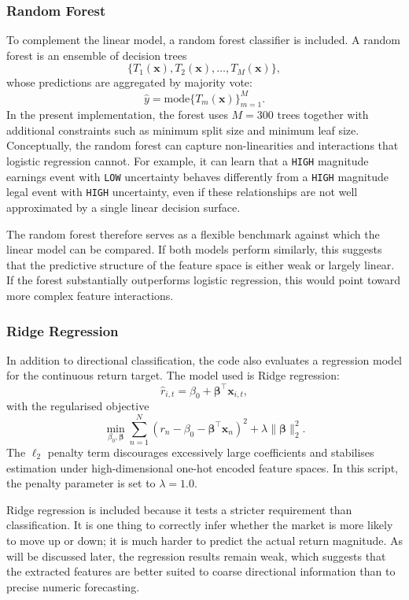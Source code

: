 \subsubsection{Random Forest}

To complement the linear model, a random forest classifier is included. A random forest is an ensemble of decision trees
\[
\{T_1(\mathbf{x}), T_2(\mathbf{x}), \ldots, T_M(\mathbf{x})\},
\]
whose predictions are aggregated by majority vote:
\[
\hat{y} = \text{mode}\{T_m(\mathbf{x})\}_{m=1}^{M}.
\]
In the present implementation, the forest uses $M=300$ trees together with additional constraints such as minimum split size and minimum leaf size. Conceptually, the random forest can capture non-linearities and interactions that logistic regression cannot. For example, it can learn that a \texttt{HIGH} magnitude earnings event with \texttt{LOW} uncertainty behaves differently from a \texttt{HIGH} magnitude legal event with \texttt{HIGH} uncertainty, even if these relationships are not well approximated by a single linear decision surface.

The random forest therefore serves as a flexible benchmark against which the linear model can be compared. If both models perform similarly, this suggests that the predictive structure of the feature space is either weak or largely linear. If the forest substantially outperforms logistic regression, this would point toward more complex feature interactions.

\subsubsection{Ridge Regression}

In addition to directional classification, the code also evaluates a regression model for the continuous return target. The model used is Ridge regression:
\[
\hat{r}_{i,t} = \beta_0 + \boldsymbol{\beta}^{\top}\mathbf{x}_{i,t},
\]
with the regularised objective
\[
\min_{\beta_0,\boldsymbol{\beta}}
\sum_{n=1}^{N}
\left(r_n - \beta_0 - \boldsymbol{\beta}^{\top}\mathbf{x}_n\right)^2
+
\lambda \lVert \boldsymbol{\beta} \rVert_2^2.
\]
The $\ell_2$ penalty term discourages excessively large coefficients and stabilises estimation under high-dimensional one-hot encoded feature spaces. In this script, the penalty parameter is set to $\lambda=1.0$.

Ridge regression is included because it tests a stricter requirement than classification. It is one thing to correctly infer whether the market is more likely to move up or down; it is much harder to predict the actual return magnitude. As will be discussed later, the regression results remain weak, which suggests that the extracted features are better suited to coarse directional information than to precise numeric forecasting.

